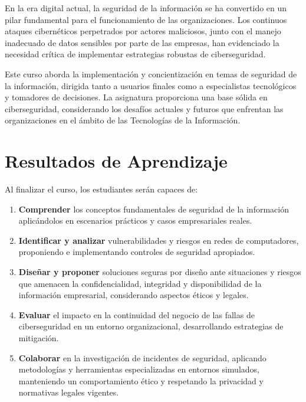 \documentclass[12pt,a4paper]{article}
\begin{document}
En la era digital actual, la seguridad de la información se ha convertido en un pilar fundamental para el funcionamiento de las organizaciones. Los continuos ataques cibernéticos perpetrados por actores maliciosos, junto con el manejo inadecuado de datos sensibles por parte de las empresas, han evidenciado la necesidad crítica de implementar estrategias robustas de ciberseguridad.

Este curso aborda la implementación y concientización en temas de seguridad de la información, dirigida tanto a usuarios finales como a especialistas tecnológicos y tomadores de decisiones. La asignatura proporciona una base sólida en ciberseguridad, considerando los desafíos actuales y futuros que enfrentan las organizaciones en el ámbito de las Tecnologías de la Información.

\section*{Resultados de Aprendizaje}

Al finalizar el curso, los estudiantes serán capaces de:

\begin{enumerate}[label=\textbf{RA\arabic*.}]
\item \textbf{Comprender} los conceptos fundamentales de seguridad de la información aplicándolos en escenarios prácticos y casos empresariales reales.

\item \textbf{Identificar y analizar} vulnerabilidades y riesgos en redes de computadores, proponiendo e implementando controles de seguridad apropiados.

\item \textbf{Diseñar y proponer} soluciones seguras por diseño ante situaciones y riesgos que amenacen la confidencialidad, integridad y disponibilidad de la información empresarial, considerando aspectos éticos y legales.

\item \textbf{Evaluar} el impacto en la continuidad del negocio de las fallas de ciberseguridad en un entorno organizacional, desarrollando estrategias de mitigación.

\item \textbf{Colaborar} en la investigación de incidentes de seguridad, aplicando metodologías y herramientas especializadas en entornos simulados, manteniendo un comportamiento ético y respetando la privacidad y normativas legales vigentes.
\end{enumerate}
\end{document}
